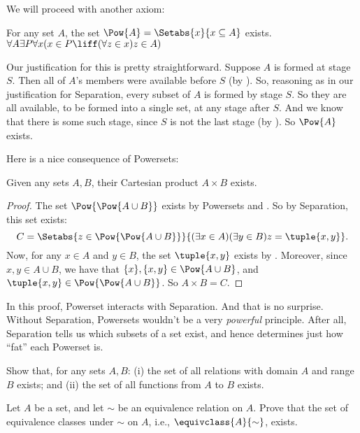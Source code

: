 \documentclass[../../../include/open-logic-section]{subfiles}
\begin{document}

We will proceed with another axiom:

\begin{axiom}[Powersets]
For any set $A$, the set $\Pow{A} = \Setabs{x}{x \subseteq A}$ exists.\\
		$\forall A \exists P \forall x(x \in P \liff (\forall z \in x)z \in A)$
\end{axiom}

Our justification for this is pretty straightforward. Suppose $A$ is
formed at stage $S$. Then all of $A$'s members were available before
$S$ (by \stagesacc). So, reasoning as in our justification for
Separation, every subset of $A$ is formed by stage $S$. So they are
all available, to be formed into a single set, at any stage after $S$.
And we know that there is some such stage, since $S$ is not the last
stage (by \stagessucc). So $\Pow{A}$ exists.
	
Here is a nice consequence of Powersets:

\begin{prop}\label{thm:Products}
Given any sets $A, B$, their Cartesian product $A \times B$ exists.
\end{prop}

\begin{proof}
The set $\Pow{\Pow{A \cup B}}$ exists by Powersets and
. So by Separation, this
set exists:
\[
	C = \Setabs{z \in \Pow{\Pow{A \cup B}}}{(\exists x \in A)(\exists y \in B) z = \tuple{x, y}}.
\]
Now, for any $x \in A$ and $y \in B$, the set $\tuple{x, y}$ exists by
. Moreover, since $x, y
\in A \cup B$, we have that $\{x\}, \{x, y\} \in \Pow{A \cup B}$, and
$\tuple{x,y} \in \Pow{\Pow{A \cup B}}$. So $A \times B = C$.
\end{proof}

In this proof, Powerset interacts with Separation. And that is no
surprise. Without Separation, Powersets wouldn't be a very
\emph{powerful} principle. After all, Separation tells us which
subsets of a set exist, and hence determines just how ``fat'' each
Powerset is.  

\begin{prob}
Show that, for any sets $A, B$: (i) the set of all relations with
domain $A$ and range $B$ exists; and (ii) the set of all functions
from $A$ to $B$ exists.
\end{prob}

\begin{prob}
Let $A$ be a set, and let $\sim$ be an equivalence relation on $A$.
Prove that the set of equivalence classes under $\sim$ on $A$, i.e.,
$\equivclass{A}{\sim}$, exists.
\end{prob}
\end{document}
